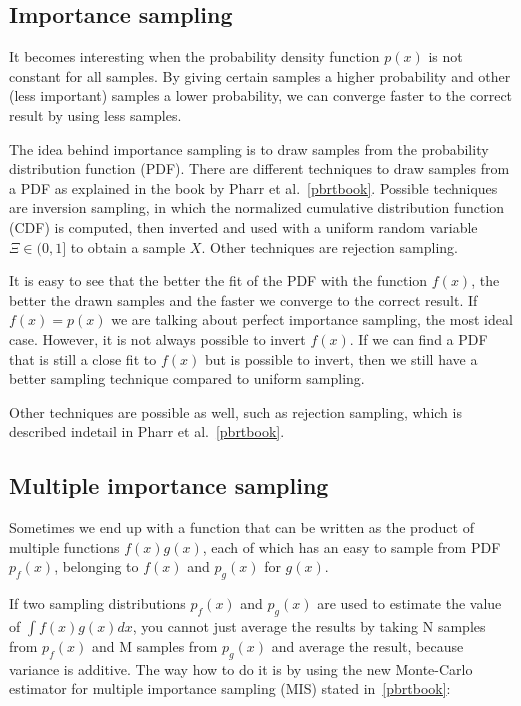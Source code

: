 \documentclass[11pt,a4paper]{report}
\begin{document}
\subsection{Importance sampling}

It becomes interesting when the probability density function $p(x)$ is not constant for all samples. By giving certain samples a higher probability and other (less important) samples a lower probability, we can converge faster to the correct result by using less samples.

The idea behind importance sampling is to draw samples from the probability distribution function (PDF). There are different techniques to draw samples from a PDF as explained in the book by Pharr et al.~\ref{pbrtbook}. Possible techniques are inversion sampling, in which the normalized cumulative distribution function (CDF) is computed, then inverted and used with a uniform random variable $\Xi \in (0, 1]$ to obtain a sample $X$. Other techniques are rejection sampling.
 
It is easy to see that the better the fit of the PDF with the function $f(x)$, the better the drawn samples and the faster we converge to the correct result. If $f(x) = p(x)$ we are talking about perfect importance sampling, the most ideal case. However, it is not always possible to invert $f(x)$. If we can find a PDF that is still a close fit to $f(x)$ but is possible to invert, then we still have a better sampling technique compared to uniform sampling.

Other techniques are possible as well, such as rejection sampling, which is described indetail in Pharr et al.~\ref{pbrtbook}.

\subsection{Multiple importance sampling}

Sometimes we end up with a function that can be written as the product of multiple functions $f(x)g(x)$, each of which has an easy to sample from PDF $p_f(x)$, belonging to $f(x)$ and $p_g(x)$ for $g(x)$.

If two sampling distributions $p_f(x)$ and $p_g(x)$ are used to estimate the value of $\int f(x)g(x) dx$, you cannot just average the results by taking N samples from $p_f(x)$ and M samples from $p_g(x)$ and average the result, because variance is additive. The way how to do it is by using the new Monte-Carlo estimator for multiple importance sampling (MIS) stated in~\ref{pbrtbook}: 
\end{document}
